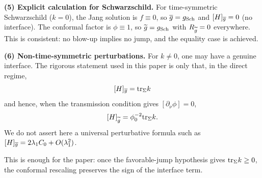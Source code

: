 \begin{remark}
\textbf{(5) Explicit calculation for Schwarzschild.} For time-symmetric Schwarzschild ($k = 0$), the Jang solution is $f \equiv 0$, so $\overline{g} = g_{\text{Sch}}$ and $[H]_{\overline{g}} = 0$ (no interface). The conformal factor is $\phi \equiv 1$, so $\widetilde{g} = g_{\text{Sch}}$ with $R_{\widetilde{g}} = 0$ everywhere. This is consistent: no blow-up implies no jump, and the equality case is achieved.

\textbf{(6) Non-time-symmetric perturbations.} For $k \neq 0$, one may have a genuine interface. The rigorous statement used in this paper is only that, in the direct regime,
\[
    [H]_{\overline{g}}=\mathrm{tr}_\Sigma k
\]
and hence, when the transmission condition gives $[\partial_\nu\phi]=0$,
\[
    [H]_{\widetilde{g}}=\phi_0^{-2}\mathrm{tr}_\Sigma k.
\]
We do not assert here a universal perturbative formula such as $[H]_{\overline{g}}=2\lambda_1 C_0+O(\lambda_1^2)$.

This is enough for the paper: once the favorable-jump hypothesis gives $\mathrm{tr}_\Sigma k\ge 0$, the conformal rescaling preserves the sign of the interface term.
\end{remark}

